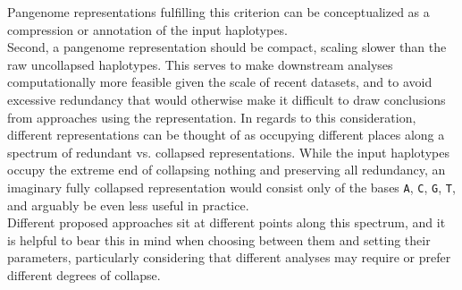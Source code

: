 Pangenome representations fulfilling this criterion can be conceptualized as a compression or annotation of the input haplotypes.\\ %
Second, a pangenome representation should be compact, scaling slower than the raw uncollapsed haplotypes. %
This serves to make downstream analyses computationally more feasible given the scale of recent datasets, and to avoid excessive redundancy that would otherwise make it difficult to draw conclusions from approaches using the representation. %
In regards to this consideration, different representations can be thought of as occupying different places along a spectrum of redundant vs. collapsed representations\cite{paten17}.
While the input haplotypes occupy the extreme end of collapsing nothing and preserving all redundancy, an imaginary fully collapsed representation would consist only of the bases \texttt{A}, \texttt{C}, \texttt{G}, \texttt{T}, and arguably be even less useful in practice.\\
Different proposed approaches sit at different points along this spectrum, and it is helpful to bear this in mind when choosing between them and setting their parameters, particularly considering that different analyses may require or prefer different degrees of collapse\cite{hickey24, sierra24, igolkina25}.

\newpage
